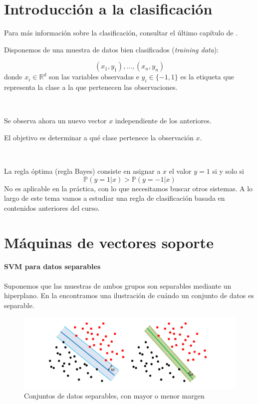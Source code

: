 
\section{Introducción a la clasificación}

Para más información sobre la clasificación, consultar el último capítulo de \citep{ApuntesEstII}.
%

Disponemos de una muestra de datos bien clasificados (\textit{training data}):

\[
(x_1,y_1),\ldots, (x_n,y_n)
\]
donde $x_i\in \mathbb{R}^d$ son las variables observadas e $y_i\in\{-1,1\}$ es la etiqueta que representa la clase a la que pertenecen las observaciones.

\

Se observa ahora un nuevo vector $x$ independiente de los anteriores.

El objetivo es determinar a qué clase pertenece la observación $x$.

\

La regla óptima (regla Bayes) consiste en asignar a $x$ el valor $y=1$ si y solo si
\[
\mathbb{P}(y=1| x) > \mathbb{P}(y=-1|x)
\]
No es aplicable en la práctica, con lo que necesitamos buscar otros sistemas. 
%
A lo largo de este tema vamos a estudiar una regla de clasificación basada en contenidos anteriores del curso.


\section{Máquinas de vectores soporte}

\paragraph{SVM para datos separables}

Suponemos que las muestras de ambos grupos son separables mediante un hiperplano. 
%
En la  encontramos una ilustración de cuándo un conjunto de datos es separable.

\begin{figure}[hbtp]
\centering
\includegraphics[scale=0.4]{img/margen}
\caption{Conjuntos de datos separables, con mayor o menor margen}
\label{fig:datosseparables}
\end{figure}

